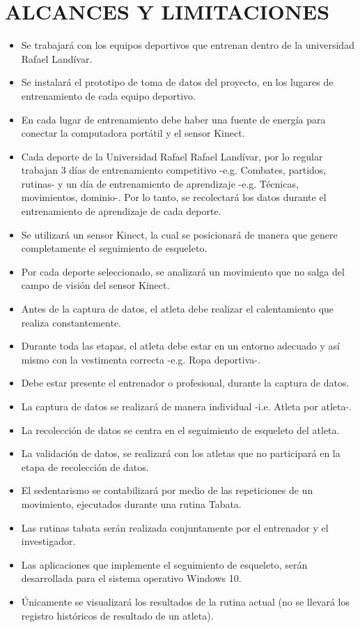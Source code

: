\section{ALCANCES Y LIMITACIONES}
\begin{itemize}
\item Se trabajar\'a con los equipos deportivos que entrenan dentro de la universidad Rafael Land\'ivar.
\item Se instalar\'a el prototipo de toma de datos del proyecto, en los lugares de entrenamiento de cada equipo deportivo.
\item En cada lugar de entrenamiento debe haber una fuente de energ\'ia para conectar la computadora port\'atil y el sensor Kinect.
\item Cada deporte de la Universidad Rafael Rafael Land\'ivar, por lo regular  trabajan  3 d\'ias de entrenamiento competitivo -e.g. Combates, partidos, rutinas- y un d\'ia de entrenamiento de aprendizaje -e.g. T\'ecnicas, movimientos, dominio-. Por lo tanto, se recolectar\'a los datos durante el entrenamiento de aprendizaje de cada deporte.
\item Se utilizar\'a un sensor Kinect, la cual se posicionar\'a de manera que genere completamente el seguimiento de esqueleto.
\item Por cada deporte seleccionado, se analizar\'a un movimiento que no salga del campo de visi\'on del sensor Kinect.
\item Antes de la captura de datos, el atleta debe realizar el calentamiento que realiza constantemente.
\item Durante toda las etapas, el atleta debe estar en un entorno adecuado y as\'i mismo con la vestimenta correcta -e.g. Ropa deportiva-.
\item Debe estar presente el entrenador o profesional, durante la captura de datos.
\item  La captura de datos se realizar\'a de manera individual -i.e. Atleta por atleta-.
\item  La recolecci\'on de datos se centra en el seguimiento de esqueleto del atleta.
\item La validaci\'on de datos, se realizar\'a con los atletas que no participar\'a en la etapa de recolecci\'on de datos.
\item El sedentarismo se contabilizar\'a por medio de las repeticiones de un  movimiento, ejecutados durante una rutina Tabata.
\item Las rutinas tabata ser\'an realizada conjuntamente por el entrenador y el investigador.
\item Las aplicaciones que implemente el seguimiento de esqueleto, ser\'an desarrollada para el sistema operativo Windows 10.
\item \'Unicamente se visualizar\'a los resultados de la rutina actual (no se llevar\'a los registro hist\'oricos de resultado de un atleta).
\end{itemize}